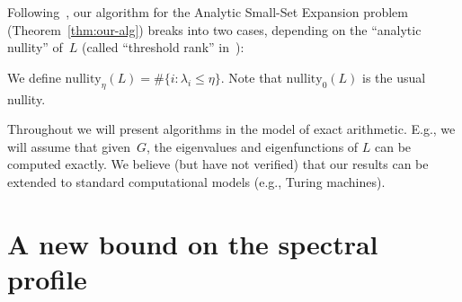 \documentclass[11pt]{article}
\newcommand{\nullity}{\mathrm{nullity}}
\begin{document}
Following~\cite{ABS10}, our algorithm for the Analytic Small-Set Expansion problem (Theorem~\ref{thm:our-alg}) breaks into two cases, depending on the ``analytic nullity'' of~$L$ (called ``threshold rank'' in~\cite{ABS10}):
\begin{definition}
    We define $\nullity_\eta(L) = \#\{i : \lambda_i \leq \eta\}$.  Note that $\nullity_0(L)$ is the usual nullity.
\end{definition}

\begin{remark}
Throughout we will present algorithms in the model of exact arithmetic. E.g., we will assume that given~$G$, the eigenvalues and eigenfunctions of $L$ can be computed exactly.  We believe (but have not verified) that our results can be extended to standard computational models (e.g., Turing machines).
\end{remark}

\section{A new bound on the spectral profile}
\end{document}
